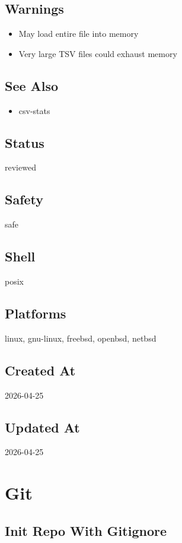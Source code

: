 \documentclass[openany]{book}
\begin{document}
\section*{Warnings}
\begin{itemize}
  \item May load entire file into memory
  \item Very large TSV files could exhaust memory
\end{itemize}

\section*{See Also}
\begin{itemize}
  \item csv-stats
\end{itemize}

\section*{Status}
reviewed

\section*{Safety}
safe

\section*{Shell}
posix

\section*{Platforms}
linux, gnu-linux, freebsd, openbsd, netbsd

\section*{Created At}
2026-04-25

\section*{Updated At}
2026-04-25

\chapter{Git}

\section{Init Repo With Gitignore}
\end{document}
